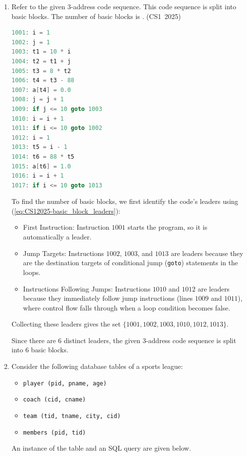 \begin{enumerate}[label=\thesubsection.\arabic*, ref=\thesubsection.\theenumi]
\vspace{0.5cm}
\item Refer to the given 3-address code sequence. This code sequence is split into basic blocks. The number of basic blocks is \underline{\hspace{1cm}}.
\hfill (CS1~2025)
\begin{lstlisting}[language=C]
1001: i = 1
1002: j = 1
1003: t1 = 10 * i
1004: t2 = t1 + j
1005: t3 = 8 * t2
1006: t4 = t3 - 88
1007: a[t4] = 0.0
1008: j = j + 1
1009: if j <= 10 goto 1003
1010: i = i + 1
1011: if i <= 10 goto 1002
1012: i = 1
1013: t5 = i - 1
1014: t6 = 88 * t5
1015: a[t6] = 1.0
1016: i = i + 1
1017: if i <= 10 goto 1013
\end{lstlisting}

\vspace{0.2cm}
\solution
To find the number of basic blocks, we first identify the code's leaders using (\ref{eq:CS12025-basic_block_leaders}):
\begin{itemize}
    \item First Instruction: Instruction $1001$ starts the program, so it is automatically a leader.
    \item Jump Targets: Instructions $1002$, $1003$, and $1013$ are leaders because they are the destination targets of conditional jump (\texttt{goto}) statements in the loops.
    \item Instructions Following Jumps: Instructions $1010$ and $1012$ are leaders because they immediately follow jump instructions (lines $1009$ and $1011$), where control flow falls through when a loop condition becomes false.
\end{itemize}

Collecting these leaders gives the set $\{1001, 1002, 1003, 1010, 1012, 1013\}$. 

Since there are $6$ distinct leaders, the given 3-address code sequence is split into $6$ basic blocks.

\vspace{0.5cm}
\item Consider the following database tables of a sports league:
\begin{itemize}
    \item \texttt{player (pid, pname, age)}
    \item \texttt{coach (cid, cname)}
    \item \texttt{team (tid, tname, city, cid)}
    \item \texttt{members (pid, tid)}
\end{itemize}
An instance of the table and an SQL query are given below.


\end{enumerate}
